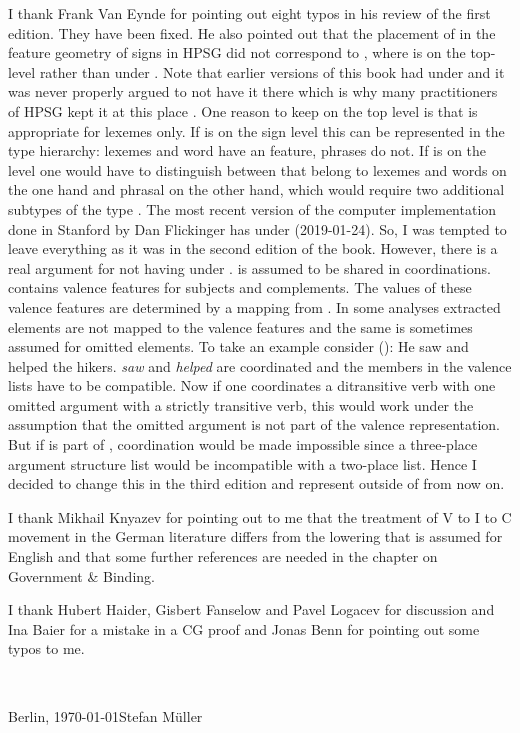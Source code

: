 I thank Frank Van Eynde for pointing out eight typos in his review of the first edition. They have
been fixed. He also pointed out that the placement of \argst in the feature geometry of signs in
HPSG did not correspond to , where \argst is on the top-level rather than under
\cat. Note that earlier versions of this book had \argst under \cat and it was never properly argued
to not have it there which is why many practitioners of HPSG kept it at this place
\citep{MuellerLFGphrasal}. One reason to keep \argst on the top level is that \argst is appropriate
for lexemes only. If \argst is on the sign level this can be represented in the type hierarchy:
lexemes and word have an \argst feature, phrases do not. If \argst is on the \cat level one would
have to distinguish between \catvs that belong to lexemes and words on the one hand and phrasal
\catvs on the other hand, which would require two additional subtypes of the type . 
The most recent version of the computer implementation done in Stanford by Dan Flickinger has \argst
under \local (2019-01-24). So, I was tempted to leave everything as it was in the second edition of
the book. However, there is a real argument for not having \argst under \cat. \cat is assumed to be
shared in coordinations. \cat contains valence features for subjects and complements. The values of
these valence features are determined by a mapping from \argst. In some analyses extracted elements
are not mapped to the valence features and the same is sometimes assumed for omitted elements. To
take an example consider ():
\ea
He saw and helped the hikers.
\z
\emph{saw} and \emph{helped} are coordinated and the members in the valence lists have to be
compatible. Now if one coordinates a ditransitive verb with one omitted argument with a strictly
transitive verb, this would work under the assumption that the omitted argument is not part of the
valence representation. But if \argst is part of \cat, coordination would be made impossible since a
three-place argument structure list would be incompatible with a two-place list. Hence I decided to
change this in the third edition and represent \argst outside of \cat from now on.


I thank Mikhail Knyazev for pointing out to me that the treatment of V to I to C movement in the
German literature differs from the lowering that is assumed for English and that some further
references are needed in the chapter on Government \& Binding. 

I thank Hubert Haider, Gisbert
Fanselow and Pavel Logacev for discussion and Ina Baier for a mistake in a CG proof and Jonas Benn for pointing out some typos to me.

~\medskip

\noindent
Berlin, \today\hfill Stefan Müller



